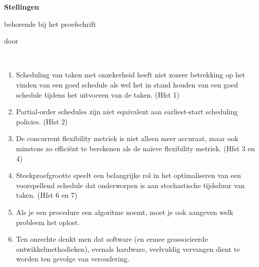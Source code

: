 \documentclass[print,nativefonts]{dissertation}
\begin{document}
\clearpage
{

\begin{center}

{\Large\titlefont\bfseries Stellingen}

\bigskip

behorende bij het proefschrift

\bigskip

{\makeatletter
\titlestyle\bfseries\large\@title
\makeatother}

{\makeatletter
\ifx\@subtitle\undefined\else
    \titlefont\titleshape\@subtitle
\fi
\makeatother}

\bigskip

door

\bigskip

\makeatletter
{\large\titlefont\bfseries\@firstname\ {\titleshape\@lastname}}
\makeatother

\end{center}

\bigskip
\bigskip

\begin{enumerate}[1.]
	\item Scheduling van taken met onzekerheid heeft niet zozeer betrekking op het vinden van een goed schedule als wel het in stand houden van een goed schedule tijdens het uitvoeren van de taken. (Hfst 1)

	\item Partial-order schedules zijn niet equivalent aan earliest-start scheduling policies. (Hfst 2)

	\item De concurrent flexibility metriek is niet alleen meer accuraat, maar ook minstens zo effici\"ent te berekenen als de na\"ieve flexibility metriek. (Hfst 3 en 4)

	\item Steekproefgrootte speelt een belangrijke rol in het optimaliseren van een voorspellend schedule dat onderworpen is aan stochastische tijdsduur van taken. (Hfst 6 en 7) 

	\item Als je een procedure een algoritme noemt, moet je ook aangeven welk probleem het oplost.

	\item Ten onrechte denkt men dat software (en ermee geassocieerde ontwikkelmethodieken), evenals hardware, veelvuldig vervangen dient te worden ten gevolge van veroudering.


\end{enumerate}}
\end{document}
